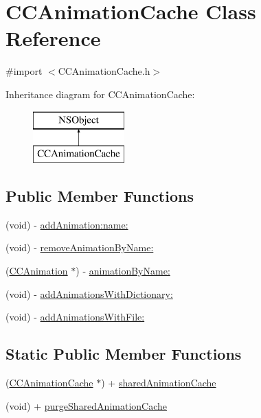 \hypertarget{interface_c_c_animation_cache}{\section{C\-C\-Animation\-Cache Class Reference}
\label{interface_c_c_animation_cache}
}


{\ttfamily \#import $<$C\-C\-Animation\-Cache.\-h$>$}

Inheritance diagram for C\-C\-Animation\-Cache\-:\begin{figure}[H]
\begin{center}
\leavevmode
\includegraphics[height=2.000000cm]{interface_c_c_animation_cache}
\end{center}
\end{figure}
\subsection*{Public Member Functions}
\begin{DoxyCompactItemize}
\item 
(void) -\/ \hyperlink{interface_c_c_animation_cache_ab137bd516a078ba912d7dcb3762107b6}{add\-Animation\-:name\-:}
\item 
(void) -\/ \hyperlink{interface_c_c_animation_cache_af9890fd4eadff83febe5aac30f9f1709}{remove\-Animation\-By\-Name\-:}
\item 
(\hyperlink{interface_c_c_animation}{C\-C\-Animation} $\ast$) -\/ \hyperlink{interface_c_c_animation_cache_ad17c5f95aaea347caed500d8fa02b4ac}{animation\-By\-Name\-:}
\item 
(void) -\/ \hyperlink{interface_c_c_animation_cache_a1005b4ef347685bf5860231331c09f84}{add\-Animations\-With\-Dictionary\-:}
\item 
(void) -\/ \hyperlink{interface_c_c_animation_cache_a1312bc730d9abfb38c153489bd96bbd6}{add\-Animations\-With\-File\-:}
\end{DoxyCompactItemize}
\subsection*{Static Public Member Functions}
\begin{DoxyCompactItemize}
\item 
(\hyperlink{interface_c_c_animation_cache}{C\-C\-Animation\-Cache} $\ast$) + \hyperlink{interface_c_c_animation_cache_adf619f2724f074683693bb4374a55571}{shared\-Animation\-Cache}
\item 
(void) + \hyperlink{interface_c_c_animation_cache_ad6998e692e308000fb2362e4a3d30ed0}{purge\-Shared\-Animation\-Cache}
\end{DoxyCompactItemize}
